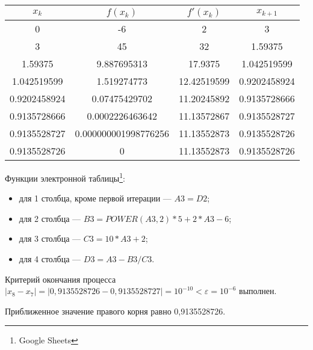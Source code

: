 \documentclass[10pt, a4paper, titlepage]{article}
\begin{document}
\begin{center}
    \begin{tabular}{|c|c|c|c|}
        \hline
        $x_k$ & $f(x_k)$ & $f'(x_k)$ & $x_{k+1}$ \\ \hline
        
        0 & -6 & 2 & 3 \\ \hline
        
        3 &	45 & 32 & 1.59375 \\ \hline
        
        1.59375	& 9.887695313 &	17.9375 & 1.042519599 \\ \hline
        
        1.042519599 & 1.519274773 & 12.42519599 &	0.9202458924 \\ \hline
        
        0.9202458924 &	0.07475429702 &	11.20245892 & 0.9135728666 \\ \hline
        
        0.9135728666 & 0.0002226463642	& 11.13572867 & 0.9135528727 \\ \hline
        
        0.9135528727 & 0.000000001998776256	& 11.13552873	& 0.9135528726 \\ \hline
        
        0.9135528726 &	0 & 11.13552873 & 0.9135528726 \\ \hline
        
    \end{tabular}
\end{center}

Функции электронной таблицы\footnote{Google Sheets}:
\begin{itemize}
    \item для 1 столбца, кроме первой итерации --- $A3=D2$;
    
    \item для 2 столбца --- $B3=POWER(A3, 2)*5+2*A3-6$;
    
    \item для 3 столбца --- $C3=10*A3+2$;
    
    \item для 4 столбца --- $D3=A3-B3/C3$.
\end{itemize}

Критерий окончания процесса $|x_8-x_7|=|0{,}9135528726-0{,}9135528727|=10^{-10}<\varepsilon=10^{-6}$ выполнен. 

Приближенное значение правого корня равно 0,9135528726.
\end{document}
